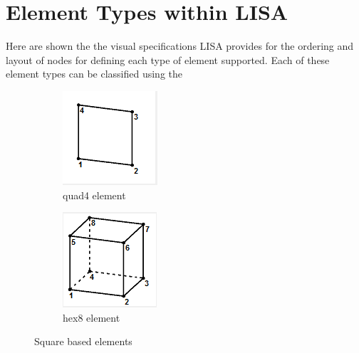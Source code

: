 \appendix

\section{Element Types within LISA}
Here are shown the the visual specifications LISA provides for the ordering and layout of nodes for defining each type of element supported. Each of these element types can be classified using the 




\begin{figure}[!h]
\centering
\begin{subfigure}{.5\textwidth}
  \centering
  \includegraphics[width=0.3\linewidth]{../Graphics/LISA-quad4.png}
  \caption{quad4 element}
  \label{fig:sub1}
\end{subfigure}%
\begin{subfigure}{.5\textwidth}
  \centering
  \includegraphics[width=0.3\linewidth]{../Graphics/LISA-hex8.png}
  \caption{hex8 element}
  \label{fig:sub2}
\end{subfigure}
\label{fig:test}
\caption{Square based elements}
\end{figure}


